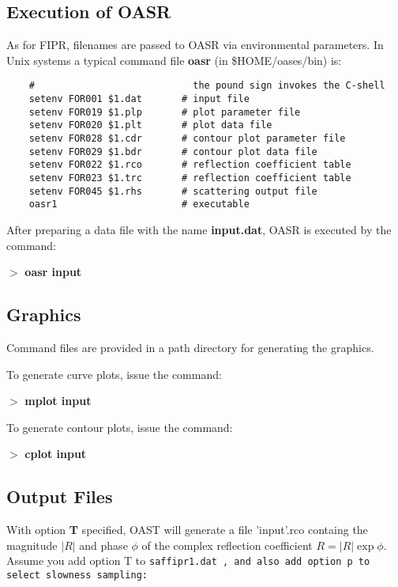 



\subsection{Execution of OASR}

    As  for  FIPR,  filenames  are  passed  to  OASR   via 
environmental parameters. In Unix systems a typical command  file 
{\bf oasr} (in  \$HOME/oases/bin) is:

\small
\begin{verbatim}
    #                            the pound sign invokes the C-shell 
    setenv FOR001 $1.dat       # input file 
    setenv FOR019 $1.plp       # plot parameter file
    setenv FOR020 $1.plt       # plot data file  
    setenv FOR028 $1.cdr       # contour plot parameter file 
    setenv FOR029 $1.bdr       # contour plot data file 
    setenv FOR022 $1.rco       # reflection coefficient table
    setenv FOR023 $1.trc       # reflection coefficient table
    setenv FOR045 $1.rhs       # scattering output file
    oasr1                      # executable
\end{verbatim}
\normalsize

    After preparing a data file with the name {\bf input.dat}, OASR  is 
executed by the command:

    $>$ {\bf oasr input}

\subsection{Graphics}  

    Command files are provided in a path directory for generating 
the graphics.

\noindent    To generate curve plots, issue the command:

    $>$ {\bf mplot input}

\noindent    To generate contour plots, issue the command:

    $>$ {\bf cplot input}

\subsection{Output Files}

With option {\bf T} specified, OAST will generate a file 'input'.rco containg
the magnitude $|R|$ and phase $ \phi $ of the complex reflection
coefficient  $R = |R| \exp \phi $. 
Assume you add option T to \tt saffipr1.dat \rm, and also add option p
to select slowness sampling:

